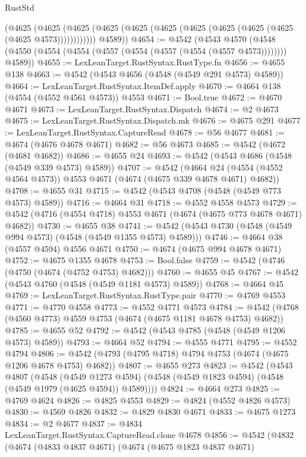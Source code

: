 \begin{lexlean}{RustStd}
\begin{coremodule}
          (@4625
            (@4625 (@4625 (@4625 (@4625 (@4625 (@4625 (@4625 (@4625 (@4625 (@4625 @4573))))))))))))
        @4589))
@4654 := @4542
    (@4543
      @4570
      (@4548 (@4550 (@4554 (@4554 (@4557 (@4554 (@4557 (@4554 (@4557 @4573)))))))) @4589))
@4655 := LexLeanTarget.RustSyntax.RustType.fn
@4656 := @4655 @138
@4663 := @4542 (@4543 @4656 (@4548 (@4549 @291 @4573) @4589))
@4664 := LexLeanTarget.RustSyntax.ItemDef.apply
@4670 := @4664 @138 (@4554 (@4552 @4561 @4573)) @4553
@4671 := Bool.true
@4672 := @4670 @4671
@4673 := LexLeanTarget.RustSyntax.Dispatch
@4674 := @2 @4673
@4675 := LexLeanTarget.RustSyntax.Dispatch.mk
@4676 := @4675 @291
@4677 := LexLeanTarget.RustSyntax.CaptureRead
@4678 := @56 @4677
@4681 := @4674 (@4676 @4678 @4671)
@4682 := @56 @4673
@4685 := @4542 (@4672 (@4681 @4682))
@4686 := @4655 @24
@4693 := @4542 (@4543 @4686 (@4548 (@4549 @339 @4573) @4589))
@4707 := @4542
    (@4664 @24 (@4554 (@4552 @4564 @4573)) @4553 @4671 (@4674 (@4675 @339 @4678 @4671) @4682))
@4708 := @4655 @31
@4715 := @4542 (@4543 @4708 (@4548 (@4549 @773 @4573) @4589))
@4716 := @4664 @31
@4718 := @4552 @4558 @4573
@4729 := @4542 (@4716 (@4554 @4718) @4553 @4671 (@4674 (@4675 @773 @4678 @4671) @4682))
@4730 := @4655 @38
@4741 := @4542 (@4543 @4730 (@4548 (@4549 @994 @4573) (@4548 (@4549 @1355 @4573) @4589)))
@4746 := @4664 @38 (@4557 @4594) @4556 @4671
@4750 := @4674 (@4675 @994 @4678 @4671)
@4752 := @4675 @1355 @4678
@4753 := Bool.false
@4759 := @4542 (@4746 (@4750 (@4674 (@4752 @4753) @4682)))
@4760 := @4655 @45
@4767 := @4542 (@4543 @4760 (@4548 (@4549 @1181 @4573) @4589))
@4768 := @4664 @45
@4769 := LexLeanTarget.RustSyntax.RustType.pair
@4770 := @4769 @4553
@4771 := @4770 @4558
@4773 := @4552 @4771 @4573
@4784 := @4542 (@4768 (@4560 @4773) @4559 @4753 (@4674 (@4675 @1181 @4678 @4753) @4682))
@4785 := @4655 @52
@4792 := @4542 (@4543 @4785 (@4548 (@4549 @1206 @4573) @4589))
@4793 := @4664 @52
@4794 := @4555 @4771
@4795 := @4552 @4794
@4806 := @4542 (@4793 (@4795 @4718) @4794 @4753 (@4674 (@4675 @1206 @4678 @4753) @4682))
@4807 := @4655 @273
@4823 := @4542
    (@4543
      @4807
      (@4548
        (@4549 @1273 @4594)
        (@4548 (@4549 @1823 @4594) (@4548 (@4549 @1979 (@4625 @4594)) @4589))))
@4824 := @4664 @273
@4825 := @4769 @4624
@4826 := @4825 @4553
@4829 := @4824 (@4552 @4826 @4573)
@4830 := @4569 @4826
@4832 := @4829 @4830 @4671
@4833 := @4675 @1273
@4834 := @2 @4677
@4837 := @4834 LexLeanTarget.RustSyntax.CaptureRead.clone @4678
@4856 := @4542
    (@4832
      (@4674
        (@4833 @4837 @4671)
        (@4674
          (@4675 @1823 @4837 @4671)

\end{coremodule}
\end{lexlean}

